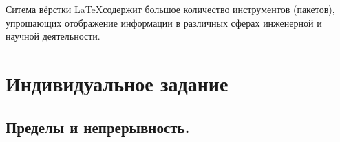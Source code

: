 \documentclass[12pt]{article}
\begin{document}
Ситема вёрстки \LaTeX содержит большое количество инструментов (пакетов), упрощающих отображение информации в различных 
сферах инженерной и научной деятельности. 
\newpage
\section{Индивидуальное задание}
%

\subsection{Пределы и непрерывность.}

\end{document}
